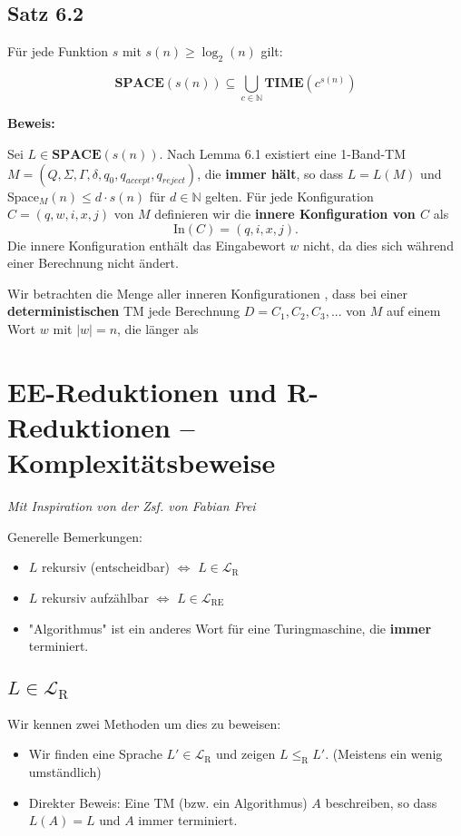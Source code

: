 \documentclass[a4paper, 11pt]{article}
\def\N{\mathbb{N}}
\def\L{\mathcal{L}}
\begin{document}
    \subsection*{Satz 6.2}
    Für jede Funktion $s$ mit $s(n) \geq \log_2(n)$ gilt:

    $$\textbf{SPACE}(s(n)) \subseteq \bigcup_{c \in \N} \textbf{TIME}(c^{s(n)})$$

    \textbf{Beweis: } 

    Sei $L \in \textbf{SPACE}(s(n))$. Nach Lemma 6.1 existiert eine 1-Band-TM $M=(Q,\Sigma,\Gamma,\delta,q_0,q_{accept},q_{reject})$, die \textbf{immer hält}, so dass $L = L(M)$ und Space$_M(n) \leq d \cdot s(n)$ für $d \in \N$ gelten. Für jede Konfiguration $C =(q,w,i,x,j)$ von $M$ definieren wir die \textbf{innere Konfiguration von $C$} als $$\text{In}(C) = (q,i,x,j).$$ 
    Die innere Konfiguration enthält das Eingabewort $w$ nicht, da dies sich während einer Berechnung nicht ändert. 

    Wir betrachten die Menge aller inneren Konfigurationen , dass bei einer \textbf{deterministischen} TM jede Berechnung $D = C_1,C_2,C_3, ...$ von $M$ auf einem Wort $w$ mit $|w| = n$, die länger als 









    \section{EE-Reduktionen und R-Reduktionen -- Komplexitätsbeweise}
    \textit{Mit Inspiration von der Zsf. von Fabian Frei}

    Generelle Bemerkungen:
    \begin{itemize}
        \item $L$ rekursiv (entscheidbar) $\iff$ $L \in \L_{\text{R}}$
        \item $L$ rekursiv aufzählbar $\iff$ $L \in \L_{\text{RE}}$
        \item "Algorithmus" ist ein anderes Wort für eine Turingmaschine, die \textbf{immer} terminiert.
    \end{itemize}
    \subsection{$L \in \L_\text{R}$ }
    Wir kennen zwei Methoden um dies zu beweisen:
    \begin{itemize}
        \item Wir finden eine Sprache $L' \in \L_\text{R}$ und zeigen $L \leq_{\text{R}} L'$. (Meistens ein wenig umständlich)
        \item Direkter Beweis:  Eine TM (bzw. ein Algorithmus) $A$ beschreiben, so dass $L(A) = L$ und $A$ immer terminiert.
    \end{itemize}
\end{document}
